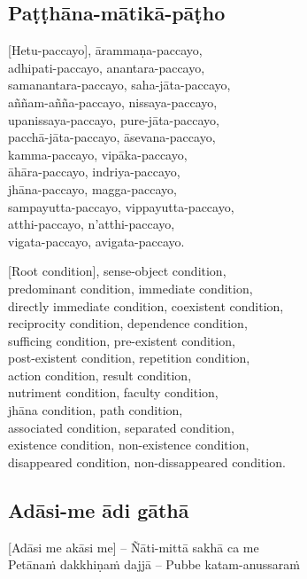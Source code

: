 \subsection{Paṭṭhāna-mātikā-pāṭho}
\label{patthana-matika-patho}
[Hetu-paccayo], ārammaṇa-paccayo,\\
adhipati-paccayo, anantara-paccayo,\\
samanantara-paccayo, saha-jāta-paccayo,\\
aññam-añña-paccayo, nissaya-paccayo,\\
upanissaya-paccayo, pure-jāta-paccayo,\\
pacchā-jāta-paccayo, āsevana-paccayo,\\
kamma-paccayo, vipāka-paccayo,\\
āhāra-paccayo, indriya-paccayo,\\
jhāna-paccayo, magga-paccayo,\\
sampayutta-paccayo, vippayutta-paccayo,\\
atthi-paccayo, n’atthi-paccayo,\\
vigata-paccayo, avigata-paccayo.

\begin{english}
  [Root condition], sense-object condition,\\
  predominant condition, immediate condition,\\
  directly immediate condition, coexistent condition,\\
  reciprocity condition, dependence condition,\\
  sufficing condition, pre-existent condition,\\
  post-existent condition, repetition condition,\\
  action condition, result condition,\\
  nutriment condition, faculty condition,\\
  jhāna condition, path condition,\\
  associated condition, separated condition,\\
  existence condition, non-existence condition,\\
  disappeared condition, non-dissappeared condition.
\end{english}

\suttaRef{[Dhs A]}

\subsection{Adāsi-me ādi gāthā}
\label{adasi-me-adi-gatha}
[Adāsi me akāsi me] – Ñāti-mittā sakhā ca me\\
Petānaṁ dakkhiṇaṁ dajjā – Pubbe katam-anussaraṁ

